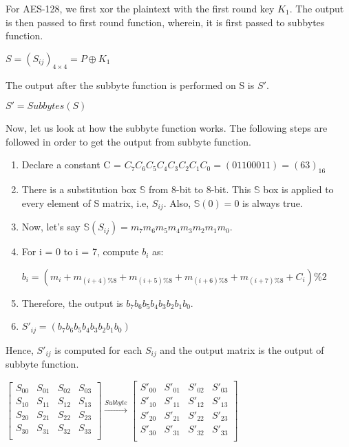 \documentclass[11pt]{article}
\begin{document}
For AES-128, we first xor the plaintext with the first round key $K_1$. The output is then passed to first round function, wherein, it is first passed to subbytes function.
\begin{center}
    $S = (S_{ij})_{4 \times 4} = P \oplus K_1$
\end{center}
The output after the subbyte function is performed on S is $S'$.
\begin{center}
    $S' = Subbytes(S)$
\end{center}

Now, let us look at how the subbyte function works. The following steps are followed in order to get the output from subbyte function.
\begin{enumerate}
    \item Declare a constant C = $C_7C_6C_5C_4C_3C_2C_1C_0 = (01100011) = (63)_{16}$
    \item There is a substitution box $\mathbb{S}$ from 8-bit to 8-bit. This $\mathbb{S}$ box is applied to every element of S matrix, i.e, $S_{ij}$. Also, $\mathbb{S}(0) = 0$ is always true.
    \item Now, let's say $\mathbb{S}(S_{ij}) = m_7m_6m_5m_4m_3m_2m_1m_0$.
    \item For i = 0 to i = 7, compute $b_i$ as:
    \begin{center}
        $b_i = (m_i + m_{(i+4)\%8} + m_{(i+5)\%8} + m_{(i+6)\%8} + m_{(i+7)\%8} + C_i) \% 2$
    \end{center}
    \item Therefore, the output is $b_7b_6b_5b_4b_3b_2b_1b_0$.
    \item $S'_{ij} = (b_7b_6b_5b_4b_3b_2b_1b_0)$
\end{enumerate}
Hence, $S'_{ij}$ is computed for each $S_{ij}$ and the output matrix is the output of subbyte function.
\begin{center}
    $
    \begin{bmatrix}
        S_{00} & S_{01} & S_{02} & S_{03}\\
        S_{10} & S_{11} & S_{12} & S_{13}\\
        S_{20} & S_{21} & S_{22} & S_{23}\\
        S_{30} & S_{31} & S_{32} & S_{33}\\
    \end{bmatrix}
    \xrightarrow{Subbyte}
    \begin{bmatrix}
        S'_{00} & S'_{01} & S'_{02} & S'_{03}\\
        S'_{10} & S'_{11} & S'_{12} & S'_{13}\\
        S'_{20} & S'_{21} & S'_{22} & S'_{23}\\
        S'_{30} & S'_{31} & S'_{32} & S'_{33}\\
    \end{bmatrix}
    $
\end{center}
\end{document}
